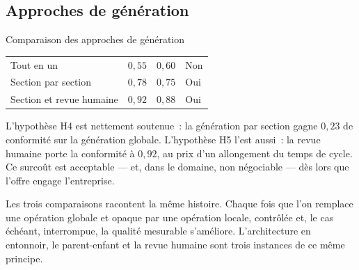 \subsection{Approches de génération}

\begin{btptable}{Comparaison des approches de génération}
\label{tab:comp-generation}
\begin{tabularx}{\linewidth}{@{}L{4.2cm} C{2.6cm} C{2.4cm} C{2.2cm}@{}}
\toprule
{}
 &  &  &  \\
\midrule
Tout en un                 & $0{,}55$ & $0{,}60$ & Non \\
Section par section        & $0{,}78$ & $0{,}75$ & Oui \\
Section et revue humaine   & $0{,}92$ & $0{,}88$ & Oui \\
\bottomrule
\end{tabularx}
\end{btptable}

L'hypothèse H4 est nettement soutenue~: la génération par section gagne
$0{,}23$ de conformité sur la génération globale. L'hypothèse H5 l'est
aussi~: la revue humaine porte la conformité à $0{,}92$, au prix d'un
allongement du temps de cycle. Ce surcoût est acceptable --- et, dans le
domaine, non négociable --- dès lors que l'offre engage l'entreprise.

\begin{btpbox}
Les trois comparaisons racontent la même histoire. Chaque fois que l'on
remplace une opération globale et opaque par une opération locale,
contrôlée et, le cas échéant, interrompue, la qualité mesurable
s'améliore. L'architecture en entonnoir, le parent-enfant et la revue
humaine sont trois instances de ce même principe.
\end{btpbox}
